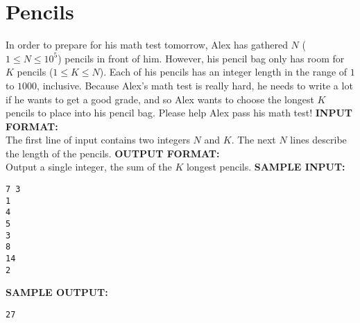 \documentclass{article}
\begin{document}
\newcommand{\blank}{\vskip 3mm}
\setlength\parindent{0pt}
\renewcommand\thesection{\Alph{section}}

\setcounter{section}{3}
\section{Pencils}

In order to prepare for his math test tomorrow, Alex has gathered $ N $ ($ 1 \leq N \leq 10^5 $) pencils in front of him. However, his pencil bag only has room for $ K $ pencils ($ 1 \leq K \leq N $). Each of his pencils has an integer length in the range of $ 1 $ to $ 1000 $, inclusive. Because Alex's math test is really hard, he needs to write a lot if he wants to get a good grade, and so Alex wants to choose the longest $ K $ pencils to place into his pencil bag.  Please help Alex pass his math test!
\blank
\textbf{INPUT FORMAT:}\\
The first line of input contains two integers $ N $ and $ K $. The next $ N $ lines describe the length of the pencils.
\blank
\textbf{OUTPUT FORMAT:}\\
Output a single integer, the sum of the $ K $ longest pencils.
\blank
\textbf{SAMPLE INPUT:}
\begin{verbatim}
7 3
1 
4 
5 
3 
8 
14 
2
\end{verbatim}
\textbf{SAMPLE OUTPUT:}
\begin{verbatim}
27
\end{verbatim}
\end{document}
